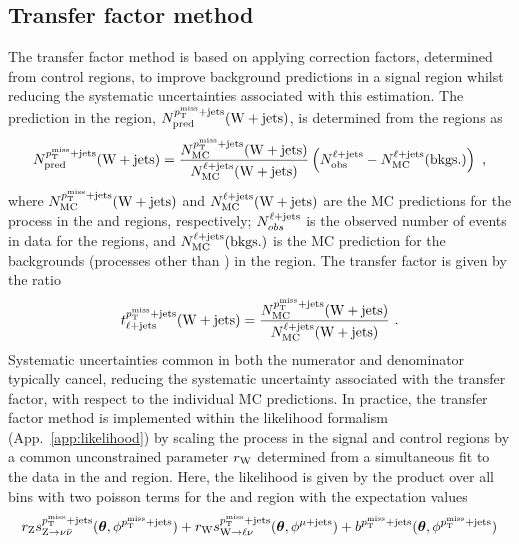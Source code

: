 \subsection{Transfer factor method}

The transfer factor method is based on applying correction factors, determined from control regions, to improve background predictions in a signal region whilst reducing the systematic uncertainties associated with this estimation.  The \IWj prediction in the \metplusjets region, $N_{\mathrm{pred}}^{p_{\text{T}}^{\mathrm{miss}}+\mathrm{jets}}({\mathrm{W}+\mathrm{jets}})$, is determined from the \ellplusjets regions as
%
\begin{equation}
    N_{\mathrm{pred}}^{p_{\text{T}}^{\mathrm{miss}}+\mathrm{jets}}({\mathrm{W}+\mathrm{jets}}) = \frac{N_{\mathrm{MC}}^{p_{\text{T}}^{\mathrm{miss}}+\mathrm{jets}}({\mathrm{W}+\mathrm{jets}})}{N_{\mathrm{MC}}^{\ell+\mathrm{jets}}({\mathrm{W}+\mathrm{jets}})} \left(N_{\mathrm{obs}}^{\ell+\mathrm{jets}} - N_{\mathrm{MC}}^{\ell+\mathrm{jets}}(\mathrm{bkgs.})\right)\ ,
\end{equation}
%
where $N_{\mathrm{MC}}^{p_{\text{T}}^{\mathrm{miss}}+\mathrm{jets}}({\mathrm{W}+\mathrm{jets}})$ and $N_{\mathrm{MC}}^{\ell+\mathrm{jets}}({\mathrm{W}+\mathrm{jets}})$ are the MC predictions for the \IWj process in the \metplusjets and \ellplusjets regions, respectively; $N_{obs}^{\ell+\mathrm{jets}}$ is the observed number of events in data for the \ellplusjets regions, and $N_{\mathrm{MC}}^{\ell+\mathrm{jets}}(\mathrm{bkgs.})$ is the MC prediction for the backgrounds (processes other than \IWj) in the \ellplusjets region. The transfer factor is given by the ratio
%
\begin{equation}
    t_{\ell+\mathrm{jets}}^{p_{\text{T}}^{\mathrm{miss}}+\mathrm{jets}}({\mathrm{W}+\mathrm{jets}}) = \frac{N_{\mathrm{MC}}^{p_{\text{T}}^{\mathrm{miss}}+\mathrm{jets}}({\mathrm{W}+\mathrm{jets}})}{N_{\mathrm{MC}}^{\ell+\mathrm{jets}}({\mathrm{W}+\mathrm{jets}})}\ .
\end{equation}
%
Systematic uncertainties common in both the numerator and denominator typically cancel, reducing the systematic uncertainty associated with the transfer factor, with respect to the individual MC predictions. In practice, the transfer factor method is implemented within the likelihood formalism (App.~\ref{app:likelihood}) by scaling the \IWj process in the signal and control regions by a common unconstrained parameter $r_{\mathrm{W}}$ determined from a simultaneous fit to the data in the \metplusjets and \ellplusjets region. Here, the likelihood is given by the product over all \recoil bins with two poisson terms for the \metplusjets and \ellplusjets region with the expectation values
%
\begin{equation}
    r_{\PZ}s_{\IZvv}^{\metplusjets}(\bm{\theta},\phi^{\metplusjets})%
    + r_{\PW}s_{\IWlv}^{\metplusjets}(\bm{\theta},\phi^{\muplusjets})%
    + b^{\metplusjets}(\bm{\theta},\phi^{\metplusjets})
\end{equation}
